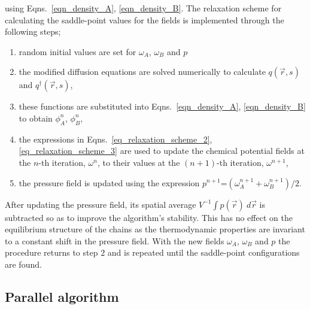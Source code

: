\documentclass[onecolumn,amsmath,amssymb,floatfix]{elsart}
\begin{document}
using Eqns.~\ref{eqn_density_A}, \ref{eqn_density_B}.
The relaxation scheme for calculating the saddle-point values for the fields
is implemented through the following steps;
%
 \begin{enumerate}
  \item  random initial values are set for $\omega_A$, $\omega_B$ and $p$
  \item  the modified diffusion equations are solved
         numerically to calculate $q({\vec r},s)$ and $q^\dagger({\vec r},s)$,
  \item  these functions are substituted into Eqns.~\ref{eqn_density_A},
         \ref{eqn_density_B} to obtain $\phi_A^n$, $\phi_B^n$,
  \item  the expressions in Eqns.~\ref{eq_relaxation_scheme_2}, \ref{eq_relaxation_scheme_3}
         are used to update the
         chemical potential fields at the $n$-th iteration, $\omega^{n}$,
         to their values at the $(n+1)$-th iteration, $\omega^{n+1}$,
  \item  the pressure field is updated using the expression
         $p^{n+1}$=$(\omega^{n+1}_A + \omega^{n+1}_B)/2$.
 \end{enumerate}
After updating the pressure field, its spatial average
$V^{-1} \int p({\vec r}) \ d{\vec r}$ is subtracted so as
to improve the algorithm's stability.
This has no effect on the equilibrium structure of the chains as the thermodynamic
properties are invariant to a constant shift in the pressure field.
With the new fields $\omega_A$, $\omega_B$ and $p$ the procedure returns
to step $2$ and is repeated until the saddle-point configurations are found.




\subsection{Parallel algorithm}
\label{subsec_parallel}
\end{document}
